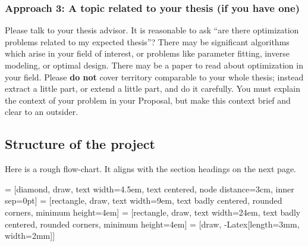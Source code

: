 \documentclass[12pt]{amsart}
\begin{document}
\subsubsection*{Approach 3: A topic related to your thesis (if you have one)}  Please talk to your thesis advisor.  It is reasonable to ask ``are there optimization problems related to my expected thesis''?  There may be significant algorithms which arise in your field of interest, or problems like parameter fitting, inverse modeling, or optimal design.  There may be a paper to read about optimization in your field.  Please \textbf{do not} cover territory comparable to your whole thesis; instead extract a little part, or extend a little part, and do it carefully.  You must explain the context of your problem in your Proposal, but make this context brief and clear to an outsider.


\newpage
\subsection*{Structure of the project}  Here is a rough flow-chart.  It aligns with the section headings on the next page.

\bigskip

 = [diamond, draw,
    text width=4.5em, text centered, node distance=3cm, inner sep=0pt]
 = [rectangle, draw,
    text width=9em, text badly centered, rounded corners, minimum height=4em]
 = [rectangle, draw,
    text width=24em, text badly centered, rounded corners, minimum height=4em]
 = [draw, -{Latex[length=3mm, width=2mm]}]
\end{document}
